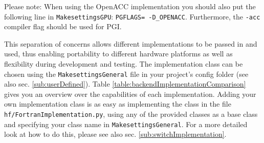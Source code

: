  Please note: When using the OpenACC implementation you should also put the following line in \verb|MakesettingsGPU|:
 \verb|PGFLAGS= -D_OPENACC|. Furthermore, the \verb|-acc| compiler flag should be used for PGI.

 This separation of concerns allows different implementations to be passed in and used, thus enabling portability to different hardware platforms as well as flexibility during development and testing. The implementation class can be chosen using the \verb|MakesettingsGeneral| file in your project's config folder (see also sec. \ref{sub:userDefined}). Table \ref{table:backendImplementationComparison} gives you an overview over the capabilities of each implementation. Adding your own implementation class is as easy as implementing the class in the file \verb|hf/FortranImplementation.py|, using any of the provided classes as a base class and specifying your class name in \verb|MakesettingsGeneral|. For a more detailed look at how to do this, please see also sec. \ref{sub:switchImplementation}.

